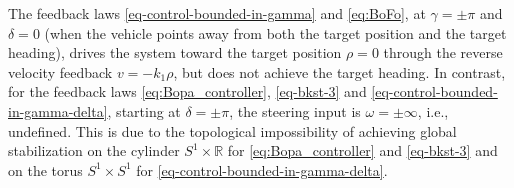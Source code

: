 \documentclass[journal,twoside,web]{ieeecolor}
\theoremstyle{definition}
\begin{document}
The feedback laws \eqref{eq-control-bounded-in-gamma} and \eqref{eq:BoFo}, at $\gamma = \pm \pi$ and $\delta = 0$ (when the vehicle points away from both the target position and the target heading), drives the system toward the target position $\rho = 0$ through the reverse velocity feedback $v = -k_1\rho$, but does not achieve the target heading. In contrast, for the feedback laws \eqref{eq:Bopa_controller},
\eqref{eq-bkst-3} and \eqref{eq-control-bounded-in-gamma-delta}, starting at $\delta=\pm \pi$, the steering input is $\omega = \pm \infty$, i.e., undefined. This is due to the topological impossibility of achieving global stabilization on 
the cylinder $ S^1\times \mathbb{R}$ for \eqref{eq:Bopa_controller} and \eqref{eq-bkst-3} and on 
the torus $S^1 \times S^1$ for \eqref{eq-control-bounded-in-gamma-delta}. 


\end{document}
